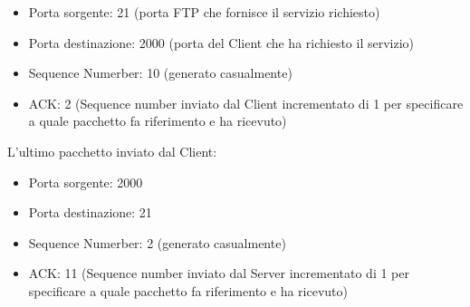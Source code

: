 \documentclass[10pt]{article}
\begin{document}
\begin{enumerate}
		\begin{itemize}
			\item Porta sorgente: 21 (porta FTP che fornisce il servizio richiesto)
			\item Porta destinazione: 2000 (porta del Client che ha richiesto il servizio)
			\item Sequence Numerber: 10 (generato casualmente)
			\item ACK: 2 (Sequence number inviato dal Client incrementato di 1 per specificare a quale pacchetto fa riferimento e ha ricevuto)
		\end{itemize}
		L'ultimo pacchetto inviato dal Client:
		\begin{itemize}
			\item Porta sorgente: 2000 
			\item Porta destinazione: 21 
			\item Sequence Numerber: 2 (generato casualmente)
			\item ACK: 11 (Sequence number inviato dal Server incrementato di 1 per specificare a quale pacchetto fa riferimento e ha ricevuto)
		\end{itemize}
	\end{enumerate}
\end{document}
